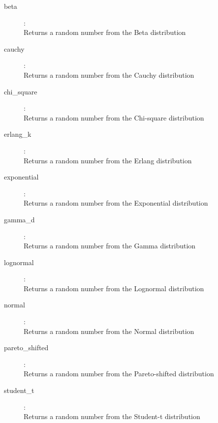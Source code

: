 \begin{description}
\item[beta]:  \\
    Returns a random number from the Beta distribution

\item[cauchy]:  \\
    Returns a random number from the Cauchy distribution

\item[chi\_square]:  \\
    Returns a random number from the Chi-square distribution

\item[erlang\_k]:  \\
    Returns a random number from the Erlang distribution

\item[exponential]:  \\
    Returns a random number from the Exponential distribution

\item[gamma\_d]:  \\
    Returns a random number from the Gamma distribution

\item[lognormal]:  \\
    Returns a random number from the Lognormal distribution

\item[normal]:  \\
    Returns a random number from the Normal distribution

\item[pareto\_shifted]:  \\
    Returns a random number from the Pareto-shifted distribution

\item[student\_t]:  \\
    Returns a random number from the Student-t distribution


\end{description}
